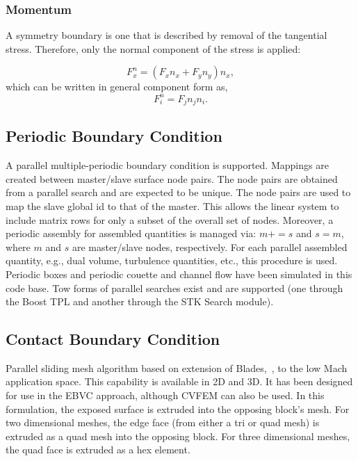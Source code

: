 \subsubsection{Momentum}
A symmetry boundary is one that is described by removal of the tangential stress. Therefore, only
the normal component of the stress is applied:

\begin{equation}
  F^n_x = (F_x n_x + F_y n_y ) n_x,
\end{equation}
which can be written in general component form as,
\begin{equation}
  F^n_i = F_j n_j n_i.
\end{equation}

\subsection{Periodic Boundary Condition}
A parallel multiple-periodic boundary condition is supported. Mappings are created between
master/slave surface node pairs. The node pairs are obtained from a parallel search and are expected
to be unique. The node pairs are used to map the slave global id to that of the master. This allows the linear
system to include matrix rows for only a subset of the overall set of nodes. Moreover, a periodic 
assembly for assembled quantities is managed via: $m+=s$ and $s=m$, where $m$ and $s$ are master/slave nodes, 
respectively. For each parallel assembled quantity, e.g., dual volume, turbulence quantities, etc., this procedure
is used. Periodic boxes and periodic couette and channel flow have been simulated in this code base. Tow forms of
parallel searches exist and are supported (one through the Boost TPL and another through the STK Search module).

\subsection{Contact Boundary Condition}
Parallel sliding mesh algorithm based on extension of Blades,~\cite{Blades:2004}, to the low Mach application 
space. This capability is available in 2D and 3D. It has been designed for use in the EBVC approach, although 
CVFEM can also be used. In this formulation, the exposed  surface is extruded into the opposing block's mesh.
For two dimensional meshes, the edge face (from either a tri or quad mesh) is extruded as a quad mesh
into the opposing block. For three dimensional meshes, the quad face is extruded as a hex element.


